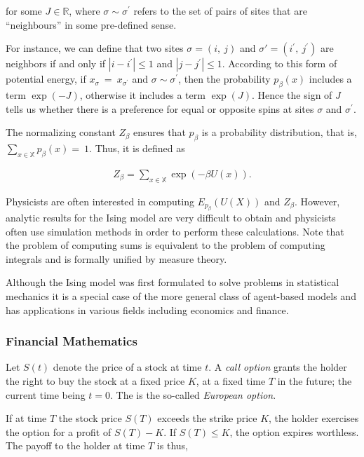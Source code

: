 \documentclass[11pt,a4paper]{article}
\begin{document}
for some \(J\mathbb{\in R}\), where \(\sigma \sim \sigma^{\prime}\) refers to
the set of pairs of sites that are ``neighbours'' in some pre-defined
sense.

For instance, we can deﬁne that two sites \(\sigma = (i,\ j)\) and
\(\sigma' = (i^{\prime},\ j^{\prime})\) are neighbors if and only if
\(\left| i - i^{\prime} \right| \leq 1\) and
\(\left| j - j^{\prime} \right| \leq 1\). According to this form of potential
energy, if \(x_{\sigma}\  = \ x_{\sigma^{\prime}}\) and
\(\sigma \sim \sigma^{\prime}\), then the probability \(p_{\beta}(x)\)
includes a term \(\exp{( - J)}\), otherwise it includes a term
\(\exp{(J)}\). Hence the sign of \(J\) tells us whether there is a
preference for equal or opposite spins at sites \(\sigma\) and
\(\sigma^{\prime}\).

The normalizing constant \(Z_{\beta}\) ensures that \(p_{\beta}\) is a
probability distribution, that is,
\(\sum_{x \in \mathbb{X}}^{}{p_{\beta}(x)} = \ 1\). Thus, it is deﬁned
as

\begin{align}Z_{\beta} = \sum_{x \in \mathbb{X}}^{}{\exp\left( - \beta U(x) \right)}.\end{align}

Physicists are often interested in computing \(E_{p_{\beta}}(U(X))\) and
\(Z_{\beta}\). However, analytic results for the Ising model are very
diﬃcult to obtain and physicists often use simulation methods in order
to perform these calculations. Note that the problem of computing sums
is equivalent to the problem of computing integrals and is formally
uniﬁed by measure theory.

Although the Ising model was first formulated to solve problems in
statistical mechanics it is a special case of the more general class of
agent-based models and has applications in various fields including
economics and finance.

\subsubsection{Financial Mathematics}\label{financial-mathematics}

Let \(S(t)\) denote the price of a stock at time \(t\). A \emph{call
option} grants the holder the right to buy the stock at a ﬁxed price
\(K\), at a ﬁxed time \(T\) in the future; the current time being
\(t = 0\). The is the so-called \emph{European option}.

If at time \(T\) the stock price \(S(T)\) exceeds the strike price
\(K\), the holder exercises the option for a proﬁt of \(S(T) - K\). If
\(S(T) \leq K\), the option expires worthless. The payoﬀ to the holder
at time \(T\) is thus,
\end{document}
